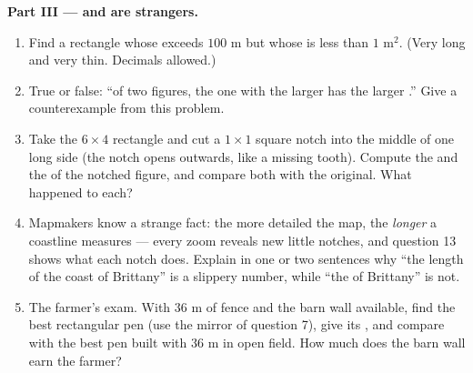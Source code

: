 \begin{problem}
\medskip
\noindent\textbf{Part III ---  and  are strangers.}
\begin{enumerate}[resume]
  \item Find a rectangle whose  exceeds $100$ m but
        whose  is less than $1$ m$^2$. (Very long and very
        thin. Decimals allowed.)
  \item True or false: ``of two figures, the one with the larger
         has the larger .'' Give a counterexample
        from this problem.
  \item Take the $6 \times 4$ rectangle and cut a $1 \times 1$
        square notch into the middle of one long side (the notch
        opens outwards, like a missing tooth). Compute the 
        and the  of the notched figure, and compare both
        with the original. What happened to each?
  \item Mapmakers know a strange fact: the more detailed the map,
        the \emph{longer} a coastline measures --- every zoom
        reveals new little notches, and question 13 shows what
        each notch does. Explain in one or two sentences why
        ``the length of the coast of Brittany'' is a slippery
        number, while ``the  of Brittany'' is not.
  \item The farmer's exam. With $36$ m of fence and the barn
        wall available, find the best rectangular pen (use the
        mirror of question 7), give its , and compare with
        the best pen built with $36$ m in open field. How much
        does the barn wall earn the farmer?
\end{enumerate}
\end{problem}
